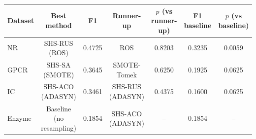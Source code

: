 \begin{tabular}{lcccccc}
\toprule
Dataset & Best method & F1 & Runner-up & $p$ (vs runner-up) & F1 baseline & $p$ (vs baseline) \\
\midrule
NR & SHS-RUS (ROS) & 0.4725 & ROS & 0.8203 & 0.3235 & 0.0059 \\
GPCR & SHS-SA (SMOTE) & 0.3645 & SMOTE-Tomek & 0.6250 & 0.1925 & 0.0625 \\
IC & SHS-ACO (ADASYN) & 0.3461 & SHS-RUS (ADASYN) & 0.4375 & 0.1600 & 0.0625 \\
Enzyme & Baseline (no resampling) & 0.1854 & SHS-ACO (ADASYN) & -- & 0.1854 & -- \\
\bottomrule
\end{tabular}
